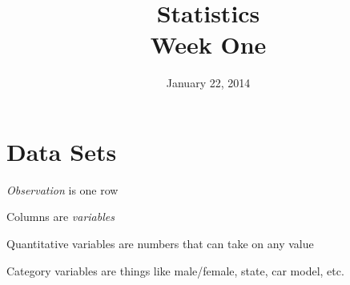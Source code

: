 \documentclass{exam}
\author{}
\date{January 22, 2014}
\title{Statistics \\ Week One}
\begin{document}
  \maketitle
  \tableofcontents

  \section{Data Sets}
  \begin{itemize*}
    \item {\em Observation} is one row
    \item Columns are {\em variables}
    \item Quantitative variables are numbers that can take on any value
    \item Category variables are things like male/female, state, car model, etc.
  \end{itemize*}
\end{document}
